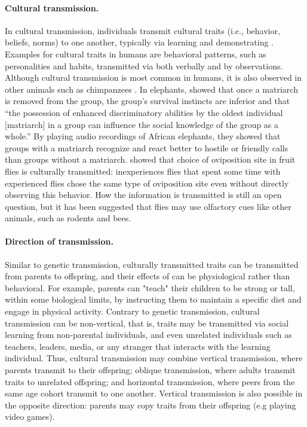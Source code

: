 \documentclass[11pt]{article}
\begin{document}
\paragraph{Cultural transmission.}
In cultural transmission, individuals transmit cultural traits (i.e., behavior, beliefs, norms) to one another, typically via learning and demonstrating \citep{transmissionVectorsBook}.
Examples for cultural traits in humans are behavioral patterns, such as personalities and habits, transmitted via both verbally and by observations. %
Although cultural transmission is most common in humans, it is also observed in other animals such as chimpanzees \citep{chimpsPrestige, chimpsCopy}. %
In elephants, \citet{elepahntsRepo} showed that once a matriarch is removed from the group, the group's survival instincts are inferior and that ``the possession of enhanced discriminatory abilities by the oldest individual [matriarch] in a group can influence the social knowledge of the group as a whole.''
By playing audio recordings of African elephants, they showed that groups with a matriarch recognize and react better to hostile or friendly calls than groups without a matriarch.
\citet{fliesPaper} showed that choice of oviposition site in fruit flies is culturally transmitted: inexperiences flies that spent some time with experienced flies chose the same type of oviposition site even without directly observing this behavior. How the information is transmitted is still an open question, but it has been suggested that flies may use olfactory cues like other animals, such as rodents and bees.

\paragraph{Direction of transmission.}
Similar to genetic transmission, culturally transmitted traits can be transmitted from parents to offspring, and their effects of can be physiological rather than behavioral.
For example, parents can "teach" their children to be strong or tall, within some biological limits, by instructing them to maintain a specific diet and engage in physical activity.
Contrary to genetic transmission, cultural transmission can be non-vertical, that is, traits may be transmitted via social learning from non-parental individuals, and even unrelated individuals such as teachers, leaders, media, or any stranger that interacts with the learning individual.
Thus, cultural transmission may combine vertical transmission, where parents transmit to their offspring; oblique transmission, where adults transmit traits to unrelated offspring; and horizontal transmission, where peers from the same age cohort transmit to one another. 
Vertical transmission is also possible in the opposite direction: parents may copy traits from their offspring (e.g playing video games)\citep{transmissionVectorsBook,transmissionVectors}.  %
\end{document}
